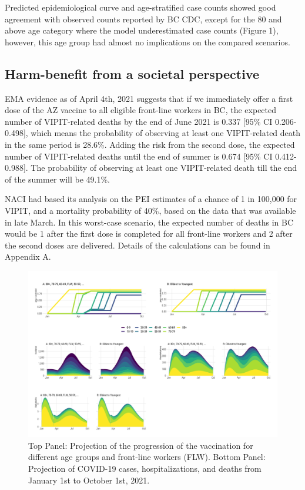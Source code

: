 \documentclass[]{elsarticle} %
\begin{document}
Predicted epidemiological curve and age-stratified case counts showed
good agreement with observed counts reported by BC CDC, except for the
80 and above age category where the model underestimated case counts
(Figure 1), however, this age group had almost no implications on the
compared scenarios.

\hypertarget{harm-benefit-from-a-societal-perspective}{%
\subsection{Harm-benefit from a societal
perspective}\label{harm-benefit-from-a-societal-perspective}}

EMA evidence as of April 4th, 2021 suggests that if we immediately offer
a first dose of the AZ vaccine to all eligible front-line workers in BC,
the expected number of VIPIT-related deaths by the end of June 2021 is
0.337 {[}95\% CI 0.206-0.498{]}, which means the probability of
observing at least one VIPIT-related death in the same period is 28.6\%.
Adding the risk from the second dose, the expected number of
VIPIT-related deaths until the end of summer is 0.674 {[}95\% CI
0.412-0.988{]}. The probability of observing at least one VIPIT-related
death till the end of the summer will be 49.1\%.

NACI had based its analysis on the PEI estimates of a chance of 1 in
100,000 for VIPIT, and a mortality probability of 40\%, based on the
data that was available in late March. In this worst-case scenario, the
expected number of deaths in BC would be 1 after the first dose is
completed for all front-line workers and 2 after the second doses are
delivered. Details of the calculations can be found in Appendix A.

\begin{figure}

{\centering \includegraphics[width=1\linewidth]{../figures/fig-trajectoriesFull} 

}

\caption{Top Panel: Projection of the progression of the vaccination for different age groups and front-line workers (FLW). Bottom Panel: Projection of COVID-19 cases, hospitalizations, and deaths from January 1st to October 1st, 2021.}\label{fig:fig1}
\end{figure}
\end{document}
